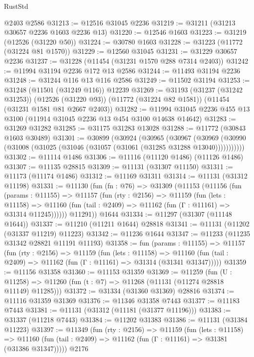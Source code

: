 \begin{lexlean}{RustStd}
\begin{coremodule}
    @2403
    @2586
@31213 := @12516 @31045 @2236
@31219 := @31211 (@31213 @30657 @2236 @1603 @2236 @13)
@31220 := @12546 @1603
@31223 := @31219 (@12526 (@31220 @50))
@31224 := @30780 @1603
@31228 := @31223 (@11772 (@31224 @81 @1570))
@31229 := @12560 @31045
@31231 := @31229 @30657 @2236
@31237 := @31228 (@11454 (@31231 @1570 @288 @7314 @2403))
@31242 := @11994 @31194 @2236 @172 @13 @2586
@31244 := @11493 @31194 @2236
@31248 := @31244 @116 @13 @116 @2586
@31249 := @11502 @31194
@31253 := @31248 (@11501 (@31249 @116)) @12239
@31269 := @31193
    (@31237 (@31242 @31253))
    (@12526 (@31220 @93))
    (@11772 (@31224 @82 @1581))
    (@11454 (@31231 @1581 @81 @2667 @2403))
@31282 := @11994 @31045 @2236 @455 @13 @3100 (@11914 @31045 @2236 @13 @454 @3100 @14638 @14642)
@31283 := @31269 @31282
@31285 := @31175 @31283 @13028
@31288 := @11772 (@30843 @1603 @30489)
@31301 := @30899
    (@30924
      (@30965
        (@30967
          (@30969 (@30990 (@31008 (@31025 (@31046 (@31057 (@31061 (@31285 @31288 @13040)))))))))))
@31302 := @11114 @1486
@31306 := @11116 (@11120 @1486) (@11126 @1486)
@31307 := @11135 @28815
@31309 := @11131 (@31307 @11150)
@31311 := @11173 (@11174 @1486)
@31312 := @11169 @31311
@31314 := @11131 (@31312 @11198)
@31331 := @11130
    (fun (fn : @76) =>
    @31309
      (@11153
        (@11156
          (fun (params : @11155) =>
          @11157
            (fun (rty : @2156) =>
            @11159
              (fun (lets : @11158) =>
              @11160 (fun (tail : @2409) => @11162 (fun (Γ : @11161) => @31314 @11245))))))
        @11291))
    @1644
@31334 := @11297 (@31307 (@11148 @1644))
@31337 := @11210 (@11211 @1644) @28818
@31341 := @11131 (@11202 (@31337 @11219) @11223)
@31342 := @11236 @1644
@31347 := @11233 (@11235 @31342 @28821 @11191 @11193)
@31358 := fun (params : @11155) =>
  @11157
    (fun (rty : @2156) =>
    @11159
      (fun (lets : @11158) =>
      @11160 (fun (tail : @2409) => @11162 (fun (Γ : @11161) => @31314 (@31341 @31347)))))
@31359 := @11156 @31358
@31360 := @11153 @31359
@31369 := @11259
    (fun (U : @11258) => @11260 (fun (t : @7) => @11268 (@11131 (@11274 @28818 @11149) @11285)))
@31372 := @31334 (@31360 @31369) @28816
@31374 := @11116 @31359 @31369
@31376 := @11346 @31358 @7443
@31377 := @11183 @7443
@31381 := @11131 (@31312 (@11181 (@31377 @11196)))
@31383 := @31337 (@11218 @7443)
@31384 := @11202 @31383
@31386 := @11131 (@31384 @11223)
@31397 := @11349
    (fun (rty : @2156) =>
    @11159
      (fun (lets : @11158) =>
      @11160 (fun (tail : @2409) => @11162 (fun (Γ : @11161) => @31381 (@31386 @31347)))))
    @2176

\end{coremodule}
\end{lexlean}
